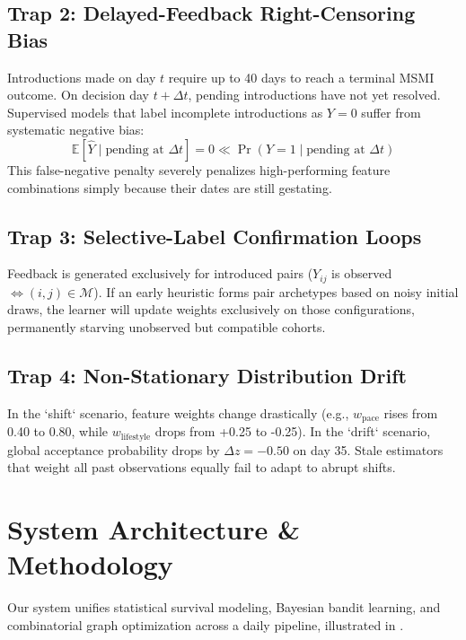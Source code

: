 \documentclass[10pt,twocolumn,letterpaper]{article}
\begin{document}
\subsection{Trap 2: Delayed-Feedback Right-Censoring Bias}
Introductions made on day $t$ require up to 40 days to reach a terminal MSMI outcome. On decision day $t + \Delta t$, pending introductions have not yet resolved. Supervised models that label incomplete introductions as $Y = 0$ suffer from systematic negative bias:
\begin{equation}
\mathbb{E}[\hat{Y} \mid \text{pending at } \Delta t] = 0 \ll \Pr(Y = 1 \mid \text{pending at } \Delta t)
\end{equation}
This false-negative penalty severely penalizes high-performing feature combinations simply because their dates are still gestating.

\subsection{Trap 3: Selective-Label Confirmation Loops}
Feedback is generated exclusively for introduced pairs ($Y_{ij}$ is observed $\iff (i, j) \in \mathcal{M}$). If an early heuristic forms pair archetypes based on noisy initial draws, the learner will update weights exclusively on those configurations, permanently starving unobserved but compatible cohorts.

\subsection{Trap 4: Non-Stationary Distribution Drift}
In the `shift` scenario, feature weights change drastically (e.g., $w_{\text{pace}}$ rises from 0.40 to 0.80, while $w_{\text{lifestyle}}$ drops from +0.25 to -0.25). In the `drift` scenario, global acceptance probability drops by $\Delta z = -0.50$ on day 35. Stale estimators that weight all past observations equally fail to adapt to abrupt shifts.

\section{System Architecture \& Methodology}
\label{sec:architecture}

Our system unifies statistical survival modeling, Bayesian bandit learning, and combinatorial graph optimization across a daily pipeline, illustrated in .
\end{document}
